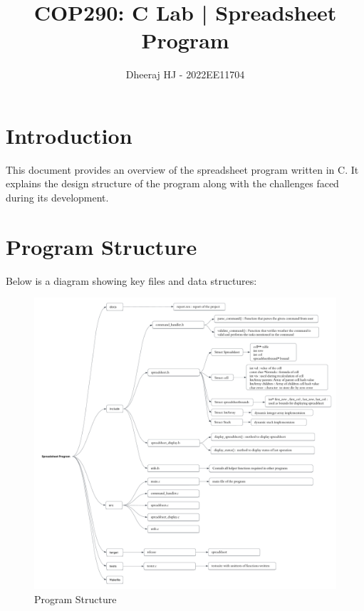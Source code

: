 \documentclass{article}
\title{COP290: C Lab | Spreadsheet Program}
\author{Dheeraj HJ - 2022EE11704}
\date{}
\begin{document}
\maketitle

\section{Introduction}
This document provides an overview of the spreadsheet program written in C. It explains the design structure of the program along with the challenges faced during its development.

\section{Program Structure}
Below is a diagram showing key files and data structures:

\begin{figure}[h]
    \centering
    \includegraphics[width=1\textwidth]{mind-map.png}
    \caption{Program Structure}
\end{figure}
\end{document}
